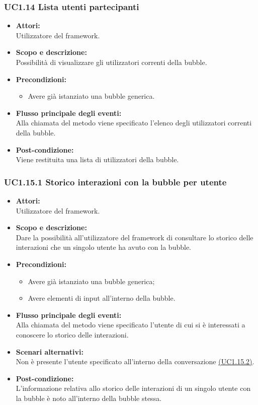 \subsubsection{UC1.14 Lista utenti partecipanti} \label{UC1.14}

\begin{itemize}
	\item \textbf{Attori:}
	\\Utilizzatore del framework.
	\item \textbf{Scopo e descrizione:} 
	\\Possibilità di visualizzare gli utilizzatori correnti della bubble.
	\item \textbf{Precondizioni:}
	\begin{itemize}
		\item Avere già istanziato una bubble generica.
	\end{itemize}
	\item \textbf{Flusso principale degli eventi:}
	\\Alla chiamata del metodo viene specificato l’elenco degli utilizzatori correnti della bubble.
	\item \textbf{Post-condizione:}
	\\Viene restituita una lista di utilizzatori della bubble.
\end{itemize}

\subsubsection{UC1.15.1 Storico interazioni con la bubble per utente} \label{UC1.15.1}

\begin{itemize}
	\item \textbf{Attori:}
	\\Utilizzatore del framework.
	\item \textbf{Scopo e descrizione:} 
	\\Dare la possibilità all'utilizzatore del framework di consultare lo storico delle interazioni che un singolo utente ha avuto con la bubble.
	\item \textbf{Precondizioni:}
	\begin{itemize}
		\item Avere già istanziato una bubble generica;
		\item Avere elementi di input all'interno della bubble.
	\end{itemize}
	\item \textbf{Flusso principale degli eventi:}
	\\Alla chiamata del metodo viene specificato l'utente di cui si è interessati a conoscere lo storico delle interazioni.
	\item \textbf{Scenari alternativi:}
	\\Non è presente l’utente specificato all’interno della conversazione \hyperref[UC1.15.2]{(UC1.15.2)}.
	\item \textbf{Post-condizione:}
	\\L'informazione relativa allo storico delle interazioni di un singolo utente con la bubble è noto all'interno della bubble stessa.
\end{itemize}

